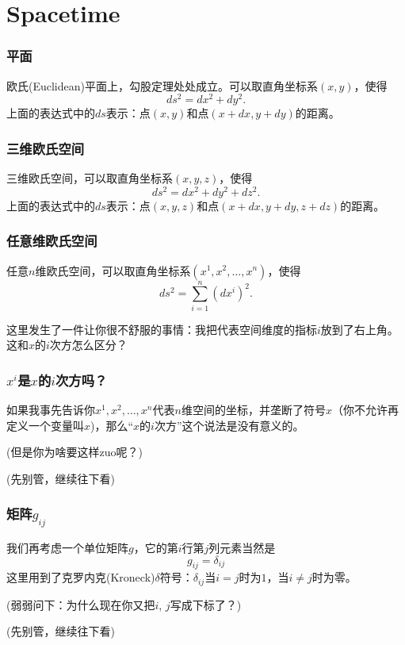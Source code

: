 \section{Spacetime}

\begin{frame}
  \frametitle{平面}
  
  欧氏(Euclidean)平面上，勾股定理处处成立。可以取直角坐标系$(x,y)$，使得
  $$ ds^2 = dx^2+dy^2.$$
  上面的表达式中的$ds$表示：点$(x,y)$和点$(x+dx, y+dy)$的距离。
\end{frame}


\begin{frame}
  \frametitle{三维欧氏空间}
  三维欧氏空间，可以取直角坐标系$(x,y,z)$，使得
  $$ ds^2 = dx^2+dy^2+dz^2.$$
  上面的表达式中的$ds$表示：点$(x,y,z)$和点$(x+dx, y+dy,z+dz)$的距离。
\end{frame}


\begin{frame}
  \frametitle{任意维欧氏空间}
  任意$n$维欧氏空间，可以取直角坐标系$(x^1, x^2,\ldots, x^n)$，使得
  $$ ds^2 = \sum_{i=1}^n (dx^i)^2.$$

  \skipline
  
  这里发生了一件让你很不舒服的事情：我把代表空间维度的指标$i$放到了右上角。这和$x$的$i$次方怎么区分？

\end{frame}


\begin{frame}
  \frametitle{$x^i$是$x$的$i$次方吗？}
  如果我事先告诉你$x^1, x^2,\ldots,x^n$代表$n$维空间的坐标，并垄断了符号$x$（你不允许再定义一个变量叫$x$)，那么``$x$的$i$次方''这个说法是没有意义的。


    (但是你为啥要这样zuo呢？)

    (先别管，继续往下看)
\end{frame}


\begin{frame}
  \frametitle{矩阵$g_{ij}$}
  我们再考虑一个单位矩阵$g$，它的第$i$行第$j$列元素当然是
  $$g_{ij} = \delta_{ij} $$
  这里用到了克罗内克(Kroneck)$\delta$符号：$\delta_{ij}$当$i=j$时为$1$，当$i\ne j$时为零。

  \skiplines

  (弱弱问下：为什么现在你又把$i$, $j$写成下标了？)

  (先别管，继续往下看)
\end{frame}


